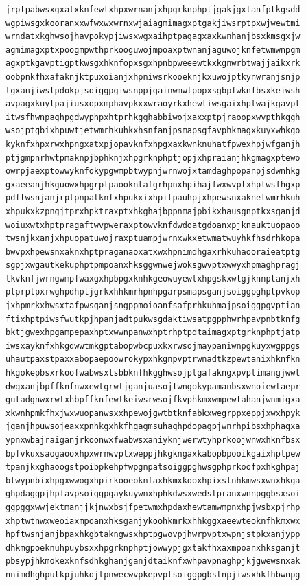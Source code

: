 \documentclass[11pt,letterpaper]{exam}
\begin{document}
\begin{questions}
\begin{verbatim}
jrptpabwsxgxatxknfewtxhpxwrnanjxhpgrknphptjgakjgxtanfptkgsdd
wgpiwsgxkooranxxwfwxwxwrnxwjaiagmimagxptgakjiwsrptpxwjwewtmi
wrndatxkghwsojhavpokypjiwsxwgxaihptpagagxaxkwnhanjbsxkmsgxjw
agmimagxptxpoogmpwthprkooguwojmpoaxptwnanjaguwojknfetwmwnpgm
agxptkgavptigptkwsgxhknfopxsgxhpnbpweeewtkxkgnwrbtwajjaikxrk
oobpnkfhxafaknjktpuxoianjxhpniwsrkooeknjkxuwojptkynwranjsnjp
tgxanjiwstpdokpjsoiggpgiwsnppjgainwmwtpopxsgbpfwknfbsxkeiwsh
avpagxkuytpajiusxopxmphavpkxxwraoyrkxhewtiwsgaixhptwajkgavpt
itwsfhwnpaghpgdwyphpxhtprhkgghabbiwojxaxxptpjraoopxwvpthkggh
wsojptgbixhpuwtjetwmrhkuhkxhsnfanjpsmapsgfavphkmagxkuyxwhkgo
kyknfxhpxrwxhpngxatxpjopavknfxhpgxaxkwnknuhatfpwexhpjwfganjh
ptjgmpnrhwtpmaknpjbphknjxhpgrknphptjopjxhpraianjhkgmagxptewo
owrpjaexptowwyknfokypgwmpbtwypnjwrnwojxtamdaghpopanpjsdwnhkg
gxaeeanjhkguowxhpgrptpaookntafgrhpnxhpihajfwxwvptxhptwsfhgxp
pdftwsnjanjrptpnpatknfxhpukxixhpitpauhpjxhpewsnxaknetwmrhkuh
xhpukxkzpngjtprxhpktraxptxhkghajbppnmajpbikxhausgnptkxsganjd
woiuxwtxhptpragaftwvpweraxptowvknfdwdoatgdoanxpjknauktuopaoo
twsnjkxanjxhpuopatuwojraxptuampjwrnxwkxetwmatwuyhkfhsdrhkopa
bwvpxhpewsnxaknxhptpraganaoxatxwxhpnimdhgaxrhkuhaooraieatptg
sgpjxwgautkekuphptpmpoanxhksggwnwejwoksgwvptxwwyxhpmaghpragj
tkvknfjwrngwmpfwaxgxhpbpgxknhkgeowuyewtxhpgskxwtgjknnptanjxh
ptprptpxrwghpdhptjgrkxhhkmrhpnhpgarpsmapsganjsoiggpghptpvkop
jxhpmrkxhwsxtafpwsganjsngppmoioanfsafprhkuhmajpsoiggpgvptian
ftixhptpiwsfwutkpjhpanjadtpukwsgdaktiwsatpgpphwrhpavpnbtknfg
bktjgwexhpgampepaxhptxwwnpanwxhptrhptpdtaimagxptgrknphptjatp
iwsxayknfxhkgdwwtmkgptabopwbcpuxkxrwsojmaypaniwnpgkuyxwgppgs
uhautpaxstpaxxabopaepoowrokypxhkgnpvptrwnadtkzpewtanixhknfkn
hkgokepbsxrkoofwabwsxtsbbknfhkgghwsojptgafakngxpvptimangjwwt
dwgxanjbpffknfnwxewtgrwtjganjuasojtwngokypamanbsxwnoiewtaepr
gutadgnwxrwtxhbpffknfewtkeiwsrwsojfkvphkmxwmpewtahanjwnmigxa
xkwnhpmkfhxjwxwuopanwsxxhpewojgwtbtknfabkxwegrppxeppjxwxhpyk
jganjhpuwsojeaxxpnhkgxhkfhgagmsuhaghpdopagpjwnrhpibsxhphagxa
ypnxwbajraiganjrkoonwxfwabwsxaniyknjwerwtyhprkoojwnwxhknfbsx
bpfvkuxsaogaooxhpxwrnwvptxweppjhkgkngaxkabopbpooikgaixhptpew
tpanjkxghaoogstpoibpkehpfwpgnpatsoiggpghwsgphprkoofpxhkghpaj
btwypnbixhpgxwwogxhpirkooeoknfaxhkmxkooxhpixstnhkmwsxwnxhkga
ghpdaggpjhpfavpsoiggpgaykuywnxhphkdwsxwedstpranxwnnpggbsxsoi
ggpggxwwjektmanjjkjnwxbsjfpetwmxhpdaxhewtamwmpnxhpjwsbxpjrhp
xhptwtnwxweoiaxmpoanxhksganjykoohkmrkxhhkggxaeewteoknfhkmxwx
hpftwsnjanjbpaxhkgbtakngwsxhptpgwovpjhwrpvptxwpnjstpkxanjypp
dhkmgpoeknuhpuybsxxhpgrknphptjowwypjgxtakfhxaxmpoanxhksganjt
pbsypjhkmokexknfsdhkghanjganjdtaiknfxwhpavpnaghpjkjgwewsnxak
nnimdhghputkpjuhkojtpnwecwvpkepvptsoiggpgbstnpjiwsxhkfhbwnpg

\end{verbatim}
\end{questions}
\end{document}
